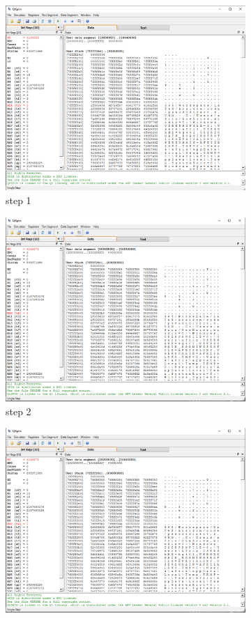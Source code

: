 \documentclass{class}
\begin{document}
\begin{enumerate}
      \begin{figure}[H]
          \begin{subfigure}{.5\textwidth}
            \centering
            \includegraphics[width=.8\linewidth]{gambar/pseudodirect1.png}
            \caption{step 1}
            \label{pseudodirect1}
          \end{subfigure}
          \begin{subfigure}{.5\textwidth}
            \centering
            \includegraphics[width=.8\linewidth]{gambar/pseudodirect2.png}
            \caption{step 2}
            \label{pseudodirect2}
          \end{subfigure}
          \begin{subfigure}{0.5\textwidth}
              \centering
              \includegraphics[width=.8\linewidth]{gambar/pseudodirect2.png}

\end{subfigure}
\end{figure}
\end{enumerate}
\end{document}
